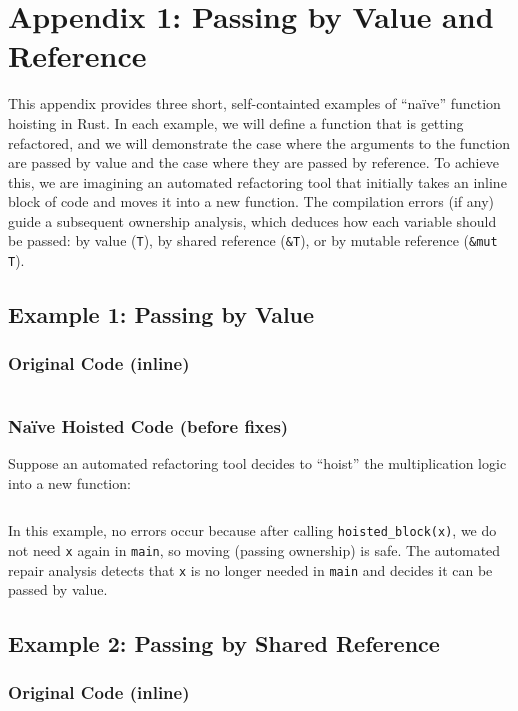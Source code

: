 \section{Appendix 1: Passing by Value and Reference}
\label{sec:appendix1}

This appendix provides three short, self-containted examples of ``na\"ive''
function hoisting in Rust. In each example, we will define a function that is
getting refactored, and we will demonstrate the case where the arguments to the
function are passed by value and the case where they are passed by reference. To
achieve this, we are imagining an automated refactoring tool that initially
takes an inline block of code and moves it into a new function. The compilation
errors (if any) guide a subsequent ownership analysis, which deduces how each
variable should be passed: by value (\texttt{T}), by shared reference
(\texttt{\&T}), or by mutable reference (\texttt{\&mut T}).

\subsection{Example 1: Passing by Value}
\subsubsection*{Original Code (inline)}
\inputminted{rust}{6_appendices/app1_code/ex1_oc.rs}

\subsubsection*{Na\"ive Hoisted Code (before fixes)}
Suppose an automated refactoring tool decides to “hoist” the multiplication
logic into a new function: \newline
\inputminted{rust}{6_appendices/app1_code/ex1_nhc.rs}
In this example, no errors occur because after calling
\texttt{hoisted\_block(x)}, we do not need \texttt{x} again in \texttt{main}, so
moving (passing ownership) is safe. The automated repair analysis detects that
\texttt{x} is no longer needed in \texttt{main} and decides it can be passed by
value.

\subsection{Example 2: Passing by Shared Reference}
\subsubsection*{Original Code (inline)}
\inputminted{rust}{6_appendices/app1_code/ex2_oc.rs}

